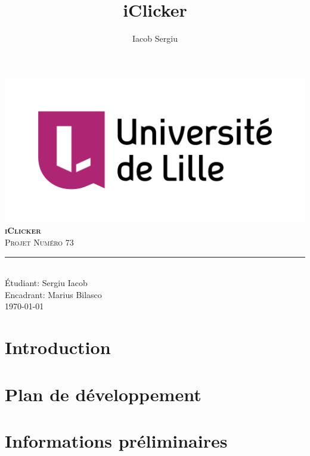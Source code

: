 \documentclass[11pt,titlepage]{report}
\author{Iacob Sergiu}
\title{iClicker}
\begin{document}
\begin{titlepage}
    \centering
    \includegraphics[width=0.75\linewidth]{universite_de_lille.png}\\[0.25cm]
    \vspace{\fill}
    \textbf{\textsc{\fontsize{50}{50}\selectfont iClicker}}\\ \vspace{\fill}		
	\textsc{\LARGE Projet Numéro 73}\\[0.4cm]
    \rule{\linewidth}{0.2 mm}\\[0.5 cm]
    Étudiant: Sergiu Iacob
    \\
    Encadrant: Marius Bilasco
    \\
    \vspace{\fill}
    \monthyeardate\today
\end{titlepage}
\restoregeometry

{\pagestyle{plain}
\tableofcontents
\cleardoublepage}

\chapter{Introduction}


\chapter{Plan de développement}


\chapter{Informations préliminaires}


% 
\end{document}
